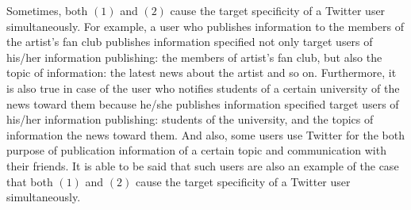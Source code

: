 Sometimes, both $(1)$ and $(2)$ cause the target specificity of a Twitter
user simultaneously.  For example, a user who publishes information to
the members of the artist's fan club publishes information specified not
only target users of his/her information publishing: the members of
artist's fan club, but also the topic of information: the latest news
about the artist and so on.  Furthermore, it is also true in case of the
user who notifies students of a certain university of the news toward
them because he/she publishes information specified target users of
his/her information publishing: students of the university, and the
topics of information the news toward them.  And also, some users use
Twitter for the both purpose of publication information of a certain
topic and communication with their friends.  It is able to be said that
such users are also an example of the case that both $(1)$ and $(2)$
cause the target specificity of a Twitter user simultaneously.